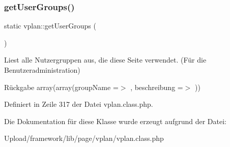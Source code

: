 \subsubsection{\texorpdfstring{get\+User\+Groups()}{getUserGroups()}}
{\footnotesize\ttfamily static vplan\+::get\+User\+Groups (\begin{DoxyParamCaption}{ }\end{DoxyParamCaption})\hspace{0.3cm}{\ttfamily [static]}}

Liest alle Nutzergruppen aus, die diese Seite verwendet. (Für die Benutzeradministration) \begin{DoxyReturn}{Rückgabe}
array(array(\textquotesingle{}group\+Name\textquotesingle{} =$>$ \textquotesingle{}\textquotesingle{}, \textquotesingle{}beschreibung\textquotesingle{} =$>$ \textquotesingle{}\textquotesingle{})) 
\end{DoxyReturn}


Definiert in Zeile 317 der Datei vplan.\+class.\+php.



Die Dokumentation für diese Klasse wurde erzeugt aufgrund der Datei\+:\begin{DoxyCompactItemize}
\item 
Upload/framework/lib/page/vplan/vplan.\+class.\+php\end{DoxyCompactItemize}
